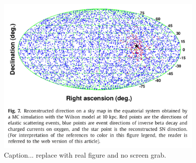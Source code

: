\documentclass[11pt, letterpaper]{article}
\begin{document}
\begin{figure}
  \begin{center}
    \includegraphics[width=4.0in]{SK-realtime-monitor-pointing}
    \caption{Caption... replace with real figure and no screen grab.}
    \label{fig:SK-realtime-monitor-pointing}
  \end{center}
\end{figure}
\end{document}
